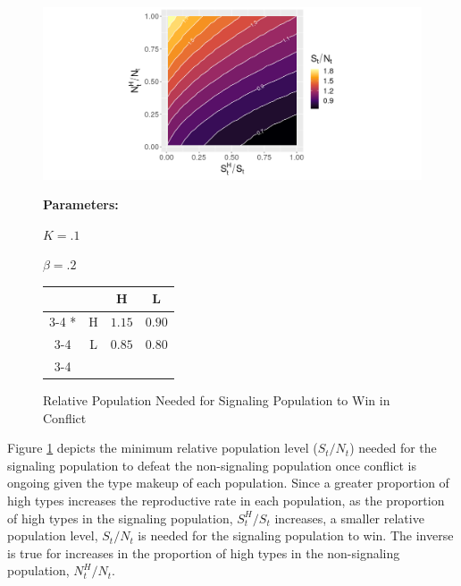  \begin{figure}[h]
   \caption{Relative Population Needed for Signaling Population to Win in Conflict}
   \label{fig:FightProps}
    \includegraphics[width=\textwidth, height=.33\textheight]{Images/FightBoundary.png}
    \begin{minipage}[c]{.2\textwidth}
    \textbf{Parameters:}
    \end{minipage}\hfill
    \begin{minipage}[c]{.2\textwidth}
    
    $K = .1$
    
    $\beta = .2$
    
    \end{minipage}\hfill
  \begin{minipage}[c]{.3\textwidth}
  \begin{tabular}{cc|c|c|}
      & \multicolumn{1}{c}{} & \multicolumn{1}{c}{H}  & \multicolumn{1}{c}{L} \\\cline{3-4}
      \multirow{2}*{}  & H & $1.15$ & $0.90$ \\\cline{3-4}
      & L & $0.85$ & $0.80$ \\\cline{3-4}
    \end{tabular}
    \end{minipage}\hfill
    \begin{minipage}[c]{.3\textwidth}
    \end{minipage}
\end{figure}

Figure \ref{fig:FightProps} depicts the minimum relative population level ($S_t/N_t$) needed for the signaling population to defeat the non-signaling population once conflict is ongoing given the type makeup of each population. Since a greater proportion of high types increases the reproductive rate in each population, as the proportion of high types in the signaling population, $S_t^H/S_t$ increases, a smaller relative population level, $S_t/N_t$ is needed for the signaling population to win. The inverse is true for increases in the proportion of high types in the non-signaling population, $N_t^H/N_t$.



